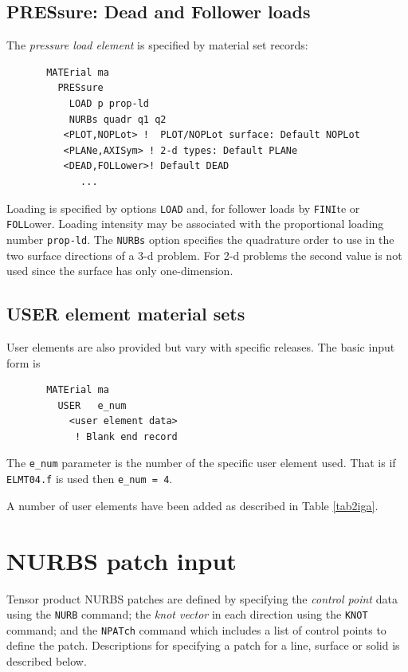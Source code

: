 \subsection{PRESsure: Dead and Follower loads}
\label{pressure}

The \textit{pressure load element} is specified by material set records:
\begin{verbatim}
       MATErial ma
         PRESsure
           LOAD p prop-ld
           NURBs quadr q1 q2
          <PLOT,NOPLot> !  PLOT/NOPLot surface: Default NOPLot
          <PLANe,AXISym> ! 2-d types: Default PLANe
          <DEAD,FOLLower>! Default DEAD
             ...
\end{verbatim}
Loading is specified by options \texttt{LOAD} and, for follower loads by
\texttt{FINI}te or \texttt{FOLL}ower.  Loading intensity may be associated
with the proportional loading number \texttt{prop-ld}.
The \texttt{NURBs} option specifies the quadrature order to use in the two
surface directions of a 3-d problem. For 2-d problems the second value is
not used since the surface has only one-dimension.

\subsection{USER element material sets}

User elements are also provided but vary with specific releases.
The basic input form is
\begin{verbatim}
       MATErial ma
         USER   e_num
           <user element data>
            ! Blank end record
\end{verbatim}
The \texttt{e\_num} parameter is the number of the specific user
element used.  That is if \texttt{ELMT04.f} is used then \texttt{e\_num = 4}.

A number of user elements have been
added as described in Table \ref{tab2iga}.


  
\section{NURBS patch input}

Tensor product
NURBS patches are defined by specifying the \textit{control point} data using
the \texttt{NURB} command; the \textit{knot vector} in each direction
using the \texttt{KNOT} command; and  the \texttt{NPATch} command which
includes a list of control points to define the patch.
Descriptions for specifying a patch for a line, surface or solid is
described below.

